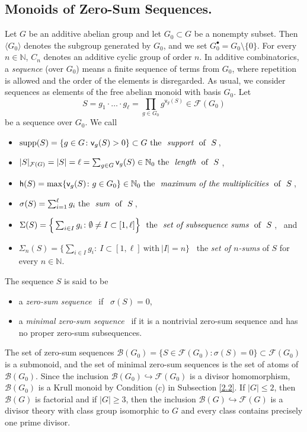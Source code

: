 \documentclass[a4paper, 10pt]{amsart}
\theoremstyle{plain}
\theoremstyle{definition}
\theoremstyle{definition}
\newcommand{\N}{\mathbb N}
\numberwithin{equation}{section}
\begin{document}
\subsection{Monoids of Zero-Sum Sequences.} \label{2.3}
Let $G$ be an additive abelian group and let $G_0 \subset G$ be a nonempty subset. Then $\langle G_0 \rangle$ denotes the subgroup generated by $G_0$, and we set $G_0^{\bullet}= G_0 \setminus \{0\}$. For every $n \in \N$, $C_n$ denotes an additive cyclic group of order $n$.
In additive combinatorics, a {\it sequence} (over $G_0$) means a finite sequence of terms from $G_0$, where repetition is allowed and the order of the elements is disregarded. As usual, we consider sequences as elements of the free abelian monoid with basis $G_0$. Let
\[
S = g_1 \cdot \ldots \cdot g_{\ell} = \prod_{g \in G_0} g^{\mathsf v_g (S)} \in \mathcal F (G_0)
\]
be a sequence over $G_0$. We  call
\begin{itemize}
\item $ \supp (S)  = \{g \in G \colon \mathsf v_g (S) > 0 \} \subset G \ \text{the \ {\it support} \ of \ $S$}\,$,
\item $|S|_{\mathcal F (G)} =  |S|  = \ell = \sum_{g \in G} \mathsf v_g (S) \in \mathbb N_0 \ \text{the \ {\it length} \ of \ $S$} \,$,
\item $\mathsf h (S) = \max \{ \mathsf v_g (S) \colon g \in G_0\} \in \N_0 \ \text{the \ {\it maximum of the multiplicities} \ of \ $S$}\,$,
\item $ \sigma (S)  = \sum_{i = 1}^{\ell} g_i \ \text{the \ {\it sum} \ of \
$S$} \,$,
\item $\Sigma (S)  = \Big\{ \sum_{i \in I} g_i \colon \emptyset \ne I \subset [1,\ell] \Big\} \ \text{ the \ {\it set of
subsequence sums} \ of \ $S$} \,$, \ and
\item $\Sigma_n (S) = \Big\{ \sum_{i \in I} g_i \colon \ I \subset [1,\ell] \ \text{with} \ |I|=n \Big\}$ \ the {\it set of $n$-sums}  of $S$ for every $n \in \N$.
\end{itemize}
The sequence $S$ is said to be
\begin{itemize}
\item a {\it zero-sum sequence} \ if \ $\sigma (S) = 0$,

\item a {\it minimal zero-sum sequence} \ if it is a nontrivial zero-sum
      sequence and has no proper zero-sum subsequences.
\end{itemize}
The set of zero-sum sequences $\mathcal B (G_0) = \{S \in \mathcal F (G_0) \colon \sigma (S)=0\} \subset \mathcal F (G_0)$ is a submonoid, and the set of minimal zero-sum sequences is the set of atoms of $\mathcal B (G_0)$. Since the inclusion $\mathcal B (G_0) \hookrightarrow \mathcal F (G_0)$ is a divisor homomorphism, $\mathcal B (G_0)$ is a Krull monoid by Condition (c) in Subsection \ref{2.2}. If $|G| \le 2$, then $\mathcal B (G)$ is factorial and if $|G| \ge 3$, then the inclusion $\mathcal B (G) \hookrightarrow \mathcal F (G)$ is a divisor theory with class group isomorphic to $G$ and every class contains precisely one prime divisor.
\end{document}
